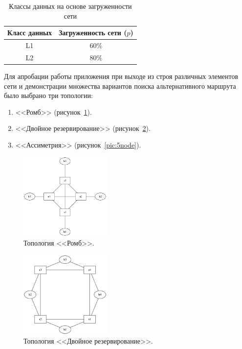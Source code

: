 \documentclass[12pt, a4paper]{article}
\begin{document}
\begin{table}[h]
	\caption{Классы данных на основе загруженности сети}
	\label{table:loadclass}
\begin{center}
\begin{tabular}{|c|c|}
\hline
	Класс данных & Загруженность сети ($p$)\\
\hline
	L1 & 60\% \\
\hline
	L2 & 80\% \\
\hline
\end{tabular}
\end{center}
\end{table}

Для апробации работы приложения при выходе из строя различных элементов сети и демонстрации множества вариантов поиска альтернативного маршрута было выбрано три топологии:
\begin{enumerate}
	\item <<Ромб>> (рисунок~\ref{pic:4node}).
	\item <<Двойное резервирование>> (рисунок~\ref{pic:double}).
	\item <<Ассиметрия>> (рисунок~\ref{pic:5node}).
\end{enumerate}

\begin{figure}[h!]
	\centering
	\includegraphics[width=0.40\textwidth]{img/4node.png}
	\caption{Топология <<Ромб>>.}
	\label{pic:4node}
\end{figure}

\begin{figure}[h!]
	\centering
	\includegraphics[width=0.40\textwidth]{img/double.png}
	\caption[russian]{Топология <<Двойное резервирование>>.}
	\label{pic:double}
\end{figure}
\end{document}
